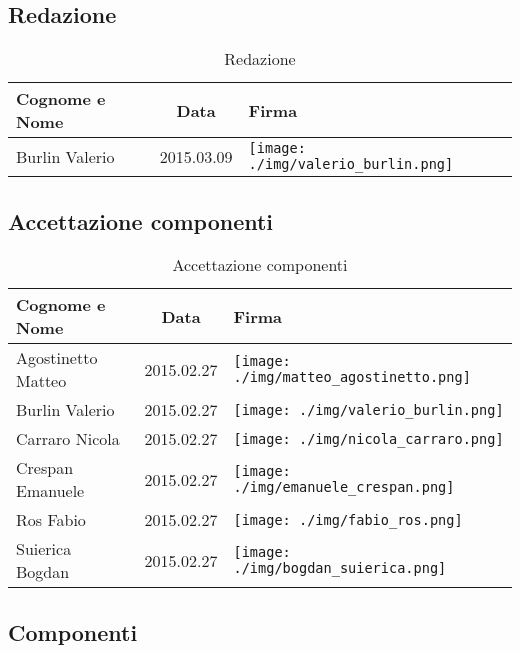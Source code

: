 \subsection{Redazione}

\begin{table}[h]
	\centering
	\begin{tabular}{|l|c|l|}
		\toprule
		\textbf{Cognome e Nome} & \textbf{Data} & \textbf{Firma} \\
		
		\midrule
		Burlin Valerio & 2015.03.09 & \texttt{[image: ./img/valerio\_burlin.png]} \\
		
		\bottomrule
	\end{tabular}
	\caption{Redazione}
\end{table}

\subsection{Accettazione componenti}

\begin{table}[h]
	\centering
	\begin{tabular}{|l|c|l|}
		\toprule
		\textbf{Cognome e Nome} & \textbf{Data} & \textbf{Firma} \\
		
		\midrule
		Agostinetto Matteo & 2015.02.27 & \texttt{[image: ./img/matteo\_agostinetto.png]} \\
		Burlin Valerio & 2015.02.27 & \texttt{[image: ./img/valerio\_burlin.png]} \\ 
		Carraro Nicola & 2015.02.27 & \texttt{[image: ./img/nicola\_carraro.png]} \\
		Crespan Emanuele & 2015.02.27 & \texttt{[image: ./img/emanuele\_crespan.png]} \\
		Ros Fabio & 2015.02.27 & \texttt{[image: ./img/fabio\_ros.png]} \\
		Suierica Bogdan & 2015.02.27 & \texttt{[image: ./img/bogdan\_suierica.png]} \\
		
		\bottomrule
	\end{tabular}
	\caption{Accettazione componenti}
\end{table}

\subsection{Componenti}

